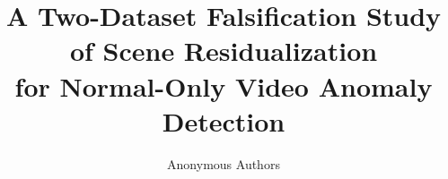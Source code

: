 \documentclass{article}
\title{A Two-Dataset Falsification Study of Scene Residualization\\
for Normal-Only Video Anomaly Detection}
\author{Anonymous Authors}
\begin{document}
\maketitle

\begin{abstract}

\end{abstract}












\appendix

\end{document}
